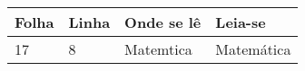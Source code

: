\begin{errata}

    \begin{table}[htb]
        \center
        \footnotesize
        \begin{tabular}{|p{1.4cm}|p{1cm}|p{3cm}|p{3cm}|}
        \hline
        \textbf{Folha} & \textbf{Linha} & \textbf{Onde se lê} &
        \textbf{Leia-se}\\
        \hline
        17 & 8 & Matemtica & Matemática \\
        \hline
        \end{tabular}
    \end{table}
    
    \end{errata}